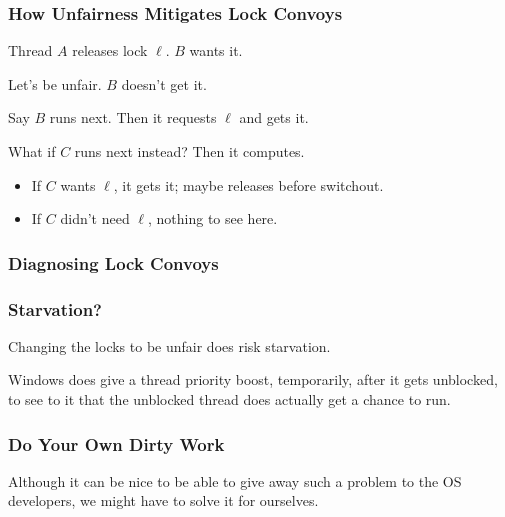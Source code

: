 \begin{frame}
\frametitle{How Unfairness Mitigates Lock Convoys}


Thread $A$ releases lock $\ell$. $B$ wants it.

Let's be unfair. $B$ doesn't get it.

Say $B$ runs next. Then it requests $\ell$ and gets it.

What if $C$ runs next instead? Then it computes.
\begin{itemize}
\item If $C$ wants $\ell$, it gets it; maybe releases before switchout.
\item If $C$ didn't need $\ell$, nothing to see here.
\end{itemize}


\end{frame}

\begin{frame}
\frametitle{Diagnosing Lock Convoys}

\begin{center}

\end{center}

\end{frame}

\begin{frame}
\frametitle{Starvation?}

Changing the locks to be unfair does risk starvation. 

Windows does give a thread priority boost, temporarily, after it gets unblocked, to see to it that the unblocked thread does actually get a chance to run.

\end{frame}

\begin{frame}
\frametitle{Do Your Own Dirty Work}

Although it can be nice to be able to give away such a problem to the OS developers, we might have to solve it for ourselves. 


\end{frame}
 

